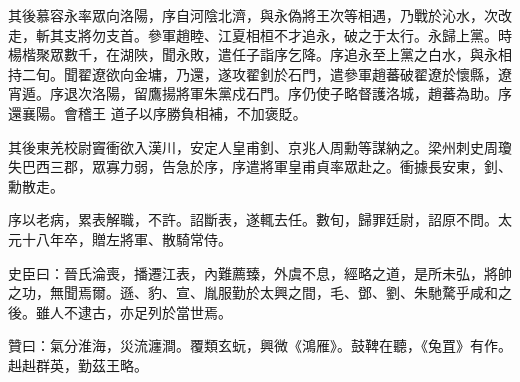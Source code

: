 \begin{pinyinscope}
 其後慕容永率眾向洛陽，序自河陰北濟，與永偽將王次等相遇，乃戰於沁水，次改走，斬其支將勿支首。參軍趙睦、江夏相桓不才追永，破之于太行。永歸上黨。時楊楷聚眾數千，在湖陜，聞永敗，遣任子詣序乞降。序追永至上黨之白水，與永相持二旬。聞翟遼欲向金墉，乃還，遂攻翟釗於石門，遣參軍趙蕃破翟遼於懷縣，遼宵遁。序退次洛陽，留鷹揚將軍朱黨戍石門。序仍使子略督護洛城，趙蕃為助。序還襄陽。會稽王
 道子以序勝負相補，不加褒貶。



 其後東羌校尉竇衝欲入漢川，安定人皇甫釗、京兆人周勳等謀納之。梁州刺史周瓊失巴西三郡，眾寡力弱，告急於序，序遣將軍皇甫貞率眾赴之。衝據長安東，釗、勳散走。



 序以老病，累表解職，不許。詔斷表，遂輒去任。數旬，歸罪廷尉，詔原不問。太元十八年卒，贈左將軍、散騎常侍。



 史臣曰：晉氏淪喪，播遷江表，內難薦臻，外虞不息，經略之道，是所未弘，將帥之功，無聞焉爾。遜、豹、宣、胤服勤於太興之間，毛、鄧、劉、朱馳騖乎咸和之後。雖人不逮古，亦足列於當世焉。



 贊曰：氣分淮海，災流瀍澗。覆類玄蚖，興微《鴻雁》。鼓鞞在聽，《兔罝》有作。赳赳群英，勤茲王略。



\end{pinyinscope}